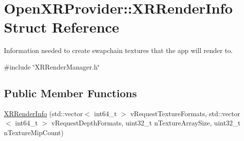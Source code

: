 \hypertarget{struct_open_x_r_provider_1_1_x_r_render_info}{}\section{Open\+X\+R\+Provider\+::X\+R\+Render\+Info Struct Reference}
\label{struct_open_x_r_provider_1_1_x_r_render_info}


Information needed to create swapchain textures that the app will render to.  




{\ttfamily \#include \char`\"{}X\+R\+Render\+Manager.\+h\char`\"{}}

\subsection*{Public Member Functions}
\begin{DoxyCompactItemize}
\item 
\mbox{\hyperlink{struct_open_x_r_provider_1_1_x_r_render_info_a29950c0229482134de3aa079017afee7}{X\+R\+Render\+Info}} (std\+::vector$<$ int64\+\_\+t $>$ v\+Request\+Texture\+Formats, std\+::vector$<$ int64\+\_\+t $>$ v\+Request\+Depth\+Formats, uint32\+\_\+t n\+Texture\+Array\+Size, uint32\+\_\+t n\+Texture\+Mip\+Count)
\end{DoxyCompactItemize}
